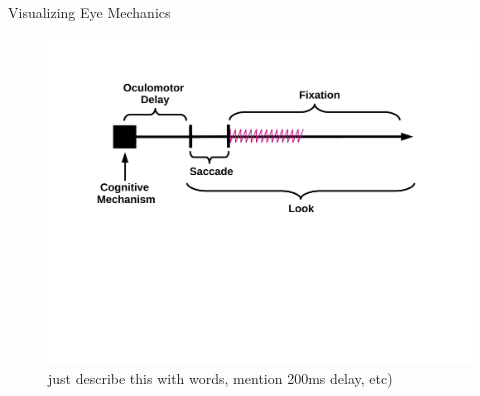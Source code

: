 \documentclass{beamer}
\begin{document}
\begin{frame}{Visualizing Eye Mechanics}
\vspace{-1mm}
\begin{figure}
\centering
\includegraphics[scale=0.45]{img/what_is_a_look.pdf}
\caption{just describe this with words, mention 200ms delay, etc)}
\end{figure}
\end{frame}
\end{document}
